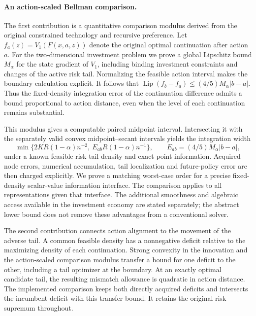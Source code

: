 \paragraph{An action-scaled Bellman comparison.}
The first contribution is a quantitative comparison modulus derived from the
original constrained technology and recursive preference. Let
$f_a(z)=V_1(F(x,a,z))$ denote the original optimal continuation after action $a$.
For the two-dimensional investment problem we prove a global Lipschitz bound
$M_\alpha$ for the state gradient of $V_1$, including binding investment
constraints and changes of the active risk tail. Normalizing the feasible action
interval makes the boundary calculation explicit. It follows that
$\operatorname{Lip}(f_b-f_a)\le(4/5)M_\alpha|b-a|$.
Thus the fixed-density integration error of the continuation difference admits
a bound proportional to action distance, even when the level of each
continuation remains substantial.

This modulus gives a computable paired midpoint interval. Intersecting it with
the separately valid convex midpoint--secant intervals yields the integration
width
\[
 \min\{2KR(1-\alpha)n^{-2},\ E_{ab}R(1-\alpha)n^{-1}\},
 \qquad E_{ab}=(4/5)M_\alpha|b-a|,
\]
under a known feasible risk-tail density and exact point information. Acquired
node errors, numerical accumulation, tail localization and future-policy error
are then charged explicitly. We prove a matching worst-case order for a precise
fixed-density scalar-value information interface. The comparison applies to all
representations given that interface. The additional smoothness and algebraic
access available in the investment economy are stated separately; the abstract
lower bound does not remove these advantages from a conventional solver.

The second contribution connects action alignment to the movement of the
adverse tail. A common feasible density has a nonnegative deficit relative to
the maximizing density of each continuation. Strong convexity in the innovation
and the action-scaled comparison modulus transfer a bound for one deficit to
the other, including a tail optimizer at the boundary. At an exactly optimal
candidate tail, the resulting mismatch allowance is quadratic in action
distance. The implemented comparison keeps both directly acquired deficits and
intersects the incumbent deficit with this transfer bound. It retains the
original risk supremum throughout.

